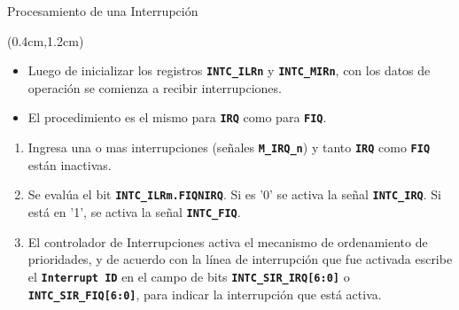 \documentclass[usenames,table,xcolor={x11names},aspectratio=169]{beamer}
\newcounter{saveenumi}
\newcommand{\seti}{\setcounter{saveenumi}{\value{enumi}}}
\begin{document}
\begin{frame}[t]{Procesamiento de una Interrupción}
 \begin{textblock*}{\textwidth}(0.4cm,1.2cm)
  \begin{itemize}[<+(1)->]\justifying \parskip 0.18cm
   \item Luego de inicializar los registros \textbf{\texttt{INTC\_ILRn}} y \textbf{\texttt{INTC\_MIRn}}, con los datos de operación se comienza a recibir interrupciones.
   \item El procedimiento es el mismo para \texttt{\textbf{IRQ}} como para \texttt{\textbf{FIQ}}.
  \end{itemize}
  \begin{enumerate}[<+(1)->]\justifying \parskip 0.18cm
   \item Ingresa una o mas interrupciones (señales \texttt{\textbf{M\_IRQ\_n}}) y tanto \texttt{\textbf{IRQ}} como \textbf{\texttt{FIQ}} están inactivas.
   \item Se evalúa el bit \textbf{\texttt{INTC\_ILRm.FIQNIRQ}}. Si es '0' se activa la señal \texttt{\textbf{INTC\_IRQ}}. Si está en '1', se activa la señal \textbf{\texttt{INTC\_FIQ}}.
   \item El controlador de Interrupciones activa el mecanismo de ordenamiento de prioridades, y de acuerdo con la línea de interrupción que fue activada escribe el \texttt{\textbf{Interrupt ID}} en el campo de bits \texttt{\textbf{INTC\_SIR\_IRQ[6:0]}} o \texttt{\textbf{INTC\_SIR\_FIQ[6:0]}}, para indicar la interrupción que está activa.
   \seti
  \end{enumerate}
 \end{textblock*}
\end{frame}
\end{document}
